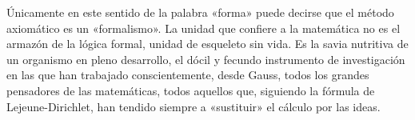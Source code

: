 \documentclass[a4paper, 12pt, draft]{article}
\begin{document}
Únicamente en este sentido de la palabra «forma» puede decirse que el método axiomático es un «formalismo». La unidad que confiere a la matemática no es el armazón de la lógica formal, unidad de esqueleto sin vida. Es la savia nutritiva de un organismo en pleno desarrollo, el dócil y fecundo instrumento de investigación en las que han trabajado conscientemente, desde Gauss, todos los grandes pensadores de las matemáticas, todos aquellos que, siguiendo la fórmula de Lejeune-Dirichlet, han tendido siempre a «sustituir» el cálculo por las ideas.
\end{document}
